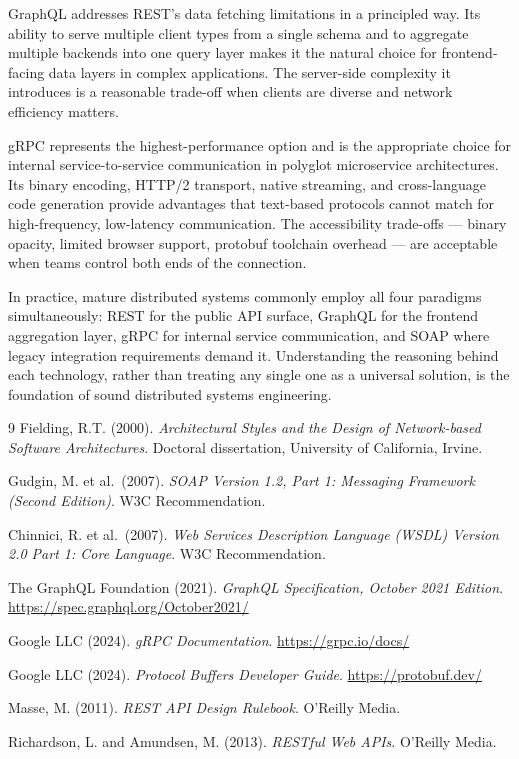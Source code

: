 \documentclass[11pt,a4paper]{article}
\begin{document}
GraphQL addresses REST's data fetching limitations in a principled way. Its ability to
serve multiple client types from a single schema and to aggregate multiple backends into
one query layer makes it the natural choice for frontend-facing data layers in complex
applications. The server-side complexity it introduces is a reasonable trade-off when
clients are diverse and network efficiency matters.

gRPC represents the highest-performance option and is the appropriate choice for internal
service-to-service communication in polyglot microservice architectures. Its binary
encoding, HTTP/2 transport, native streaming, and cross-language code generation
provide advantages that text-based protocols cannot match for high-frequency, low-latency
communication. The accessibility trade-offs --- binary opacity, limited browser support,
protobuf toolchain overhead --- are acceptable when teams control both ends of the
connection.

In practice, mature distributed systems commonly employ all four paradigms simultaneously:
REST for the public API surface, GraphQL for the frontend aggregation layer, gRPC for
internal service communication, and SOAP where legacy integration requirements demand it.
Understanding the reasoning behind each technology, rather than treating any single one
as a universal solution, is the foundation of sound distributed systems engineering.

\begin{thebibliography}{9}
Fielding, R.T. (2000).
\textit{Architectural Styles and the Design of Network-based Software Architectures}.
Doctoral dissertation, University of California, Irvine.

Gudgin, M. et al.\ (2007).
\textit{SOAP Version 1.2, Part 1: Messaging Framework (Second Edition)}.
W3C Recommendation.

Chinnici, R. et al.\ (2007).
\textit{Web Services Description Language (WSDL) Version 2.0 Part 1: Core Language}.
W3C Recommendation.

The GraphQL Foundation (2021).
\textit{GraphQL Specification, October 2021 Edition}.
\url{https://spec.graphql.org/October2021/}

Google LLC (2024).
\textit{gRPC Documentation}. \url{https://grpc.io/docs/}

Google LLC (2024).
\textit{Protocol Buffers Developer Guide}. \url{https://protobuf.dev/}

Masse, M. (2011).
\textit{REST API Design Rulebook}. O'Reilly Media.

Richardson, L. and Amundsen, M. (2013).
\textit{RESTful Web APIs}. O'Reilly Media.

\end{thebibliography}
\end{document}
